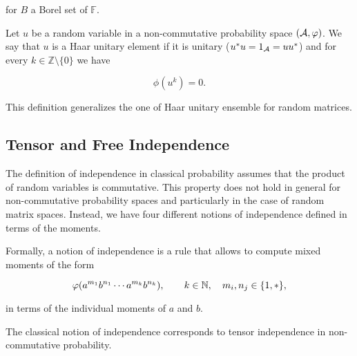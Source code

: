     \noindent for $B$ a Borel set of $\mathbb F$.

    \begin{example}
        Let $u$ be a random variable in a non-commutative probability space $(\mathcal A,\varphi)$. We say that $u$ is a Haar unitary element if it is unitary ($u^*u = 1_\mathcal A = uu^*$) and for every $k\in \mathbb Z \setminus \{0\}$ we have

        \begin{equation*}
            \phi(u^k) = 0.
        \end{equation*}
    \end{example}

    This definition generalizes the one of Haar unitary ensemble for random matrices.

\subsection{Tensor and Free Independence}

    The definition of independence in classical probability assumes that the product of random variables is commutative. This property does not hold in general for non-commutative probability spaces and particularly in the case of random matrix spaces. Instead, we have four different notions of independence defined in terms of the moments.

    Formally, a notion of independence is a rule that allows to compute mixed moments of the form

    \begin{equation*}
        \varphi(a^{m_1}b^{n_1} \cdots a^{m_{k}}b^{n_k}), \qquad k \in \mathbb N, \quad m_i, n_j \in \{1,*\},
    \end{equation*}

    \noindent in terms of the individual moments of $a$ and $b$.

    The classical notion of independence corresponds to  tensor independence in non-commutative probability.

